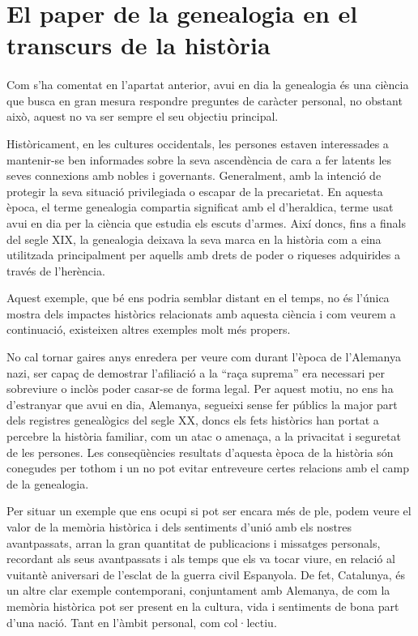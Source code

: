\section{El paper de la genealogia en el transcurs de la història}

    \paragraph{}
    Com s’ha comentat en l'apartat anterior, avui en dia la genealogia és una ciència que busca en gran mesura respondre preguntes de caràcter personal, no obstant això, aquest no va ser sempre el seu objectiu principal.

    Històricament, en les cultures occidentals, les persones estaven interessades a mantenir-se ben informades sobre la seva ascendència de cara a fer latents les seves connexions amb nobles i governants. Generalment, amb la intenció de protegir la seva situació privilegiada o escapar de la precarietat. En aquesta època, el terme genealogia compartia significat amb el d'\gls{heraldica}, terme usat avui en dia per la ciència que estudia els escuts d’armes. Així doncs, fins a finals del segle XIX, la genealogia deixava la seva marca en la història com a eina utilitzada principalment per aquells amb drets de poder o riqueses adquirides a través de l’herència.

    Aquest exemple, que bé ens podria semblar distant en el temps, no és l’única mostra dels impactes històrics relacionats amb aquesta ciència i com veurem a continuació, existeixen altres exemples molt més propers.

    No cal tornar gaires anys enredera per veure com durant l’època de l’Alemanya nazi, ser capaç de demostrar l’afiliació a la ``raça suprema'' era necessari per sobre\-viu\-re o inclòs poder casar-se de forma legal. Per aquest motiu, no ens ha d’estranyar que avui en dia, Alemanya, segueixi sense fer públics la major part dels registres genealògics del segle XX, doncs els fets històrics han portat a percebre la història familiar, com un atac o amenaça, a la privacitat i seguretat de les persones. Les conseqüències resultats d'aquesta època de la història són conegudes per tothom i un no pot evitar entreveure certes relacions amb el camp de la genealogia.

    Per situar un exemple que ens ocupi si pot ser encara més de ple, podem veure el valor de la memòria històrica i dels sentiments d’unió amb els nostres avantpassats, arran la gran quantitat de publicacions i missatges personals, recordant als seus avantpassats i als temps que els va tocar viure, en relació al vuitantè aniversari de l'esclat de la guerra civil Espanyola. De fet, Catalunya, és un altre clar exemple contemporani, conjuntament amb Alemanya, de com la memòria històrica pot ser present en la cultura, vida i sentiments de bona part d’una nació. Tant en l’àmbit personal, com col·lectiu.

